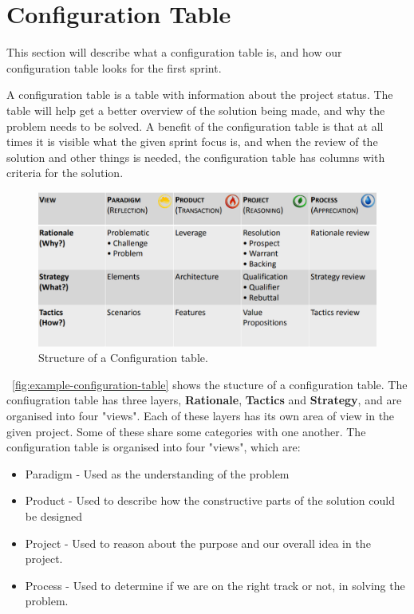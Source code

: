 \section{Configuration Table}\label{sec:first-configuration-table}
This section will describe what a configuration table is, and how our configuration table looks for the first sprint.

A configuration table is a table with information about the project status. 
The table will help get a better overview of the solution being made, and why the problem needs to be solved.
A benefit of the configuration table is that at all times it is visible what the given sprint focus is, and when the review of the solution and other things is needed, the configuration table has columns with criteria for the solution.

\begin{figure}[h]
    \centering
    \includegraphics[width=\linewidth]{images/configurationTableExample.png}
    \caption{Structure of a Configuration table.}
    \label{fig:example-configuration-table}
\end{figure}

~\autoref{fig:example-configuration-table} shows the stucture of a configuration table.
The confiugration table has three layers, \textbf{Rationale}, \textbf{Tactics} and \textbf{Strategy}, and are organised into four "views".
Each of these layers has its own area of view in the given project.
Some of these share some categories with one another.
The configuration table is organised into four "views", which are:

\begin{itemize}
    \item Paradigm - Used as the understanding of the problem
    \item Product - Used to describe how the constructive parts of the solution could be designed
    \item Project - Used to reason about the purpose and our overall idea in the project.
    \item Process - Used to determine if we are on the right track or not, in solving the problem. 
\end{itemize}

